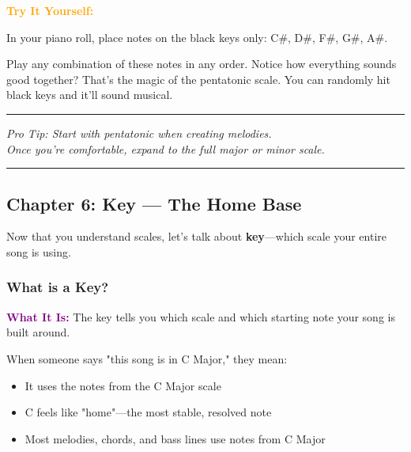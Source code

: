 \documentclass[11pt,letterpaper]{article}
\newcommand{\purple}[1]{\textcolor{purple}{\textbf{#1}}}
\newcommand{\orangetext}[1]{\textcolor{orange}{\textbf{#1}}}
\begin{document}
\textbf{\orangetext{Try It Yourself:}}

In your piano roll, place notes on the black keys only: C\#, D\#, F\#, G\#, A\#. 

Play any combination of these notes in any order. Notice how everything sounds good together? That's the magic of the pentatonic scale. You can randomly hit black keys and it'll sound musical.

\vspace{1cm}

\begin{center}
\rule{0.6\textwidth}{0.5pt}

\vspace{0.3cm}

\textit{Pro Tip: Start with pentatonic when creating melodies. \\
Once you're comfortable, expand to the full major or minor scale.}

\vspace{0.3cm}

\rule{0.6\textwidth}{0.5pt}
\end{center}

\newpage


\subsection{Chapter 6: Key — The Home Base}

Now that you understand scales, let's talk about \textbf{key}—which scale your entire song is using.

\subsubsection{What is a Key?}

\textbf{\purple{What It Is:}} The key tells you which scale and which starting note your song is built around.

When someone says "this song is in C Major," they mean:
\begin{itemize}[leftmargin=*]
\item It uses the notes from the C Major scale
\item C feels like "home"—the most stable, resolved note
\item Most melodies, chords, and bass lines use notes from C Major
\end{itemize}
\end{document}
